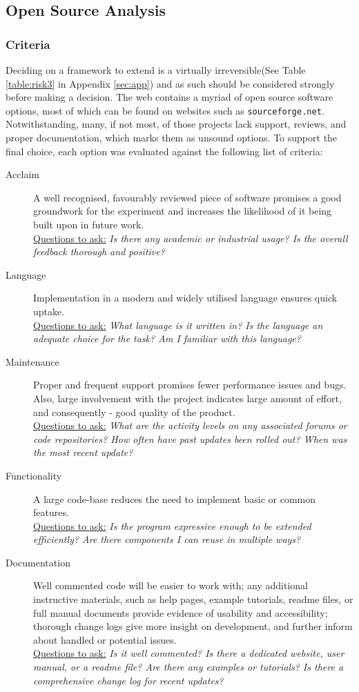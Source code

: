 \documentclass[12pt,a4,xcolor=table]{article}
\begin{document}
\subsection{Open Source Analysis}

\subsubsection{Criteria}
Deciding on a framework to extend is a virtually irreversible(See Table \ref{table:risk3} in Appendix \ref{sec:app}) and as such should be considered strongly before making a decision. The web contains a myriad of open source software options, most of which can be found on websites such as \texttt{sourceforge.net}. Notwithstanding, many, if not most, of those projects lack support, reviews, and proper documentation, which marks them as unsound options. To support the final choice, each option was evaluated against the following list of criteria:
\begin{description}
	\item[Acclaim] A well recognised, favourably reviewed piece of software promises a good groundwork for the experiment and increases the likelihood of it being built upon in future work.\\
			\underline{Questions to ask:} \textit{Is there any academic or industrial usage? Is the overall feedback thorough and positive?}
	\item[Language] Implementation in a modern and widely utilised language ensures quick uptake.\\
			\underline{Questions to ask:} \textit{What language is it written in? Is the language an adequate choice for the task? Am I familiar with this language? }
	\item[Maintenance] Proper and frequent support promises fewer performance issues and bugs. Also, large involvement with the project indicates large amount of effort, and consequently - good quality of the product.\\
			\underline{Questions to ask:} \textit{What are the activity levels on any associated forums or code repositories? How often have past updates been rolled out? When was the most recent update?}
	\item[Functionality] A large code-base reduces the need to implement basic or common features.\\
			\underline{Questions to ask:} \textit{Is the program expressive enough to be extended efficiently? Are there components I can reuse in multiple ways?}
	\item[Documentation] Well commented code will be easier to work with; any additional instructive materials, such as help pages, example tutorials, readme files, or full manual documents provide evidence of usability and accessibility; thorough change logs give more insight on development, and further inform about handled or potential issues.\\
			\underline{Questions to ask:} \textit{Is it well commented? Is there a dedicated website, user manual, or a readme file? Are there any examples or tutorials? Is there a comprehensive change log for recent updates?}
\end{description}
\end{document}
